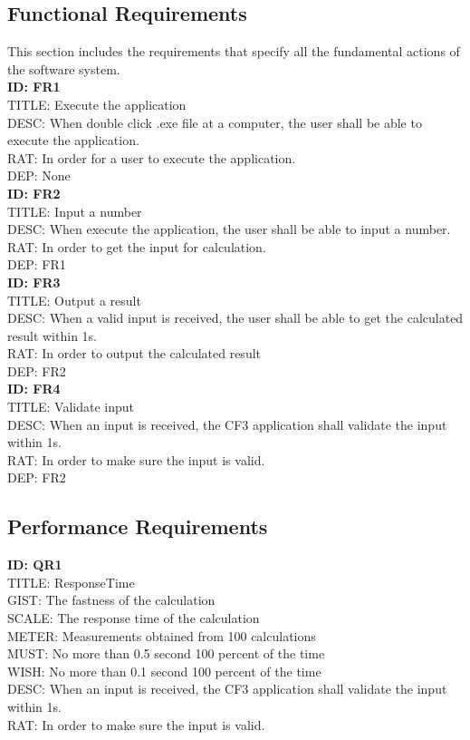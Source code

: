 \documentclass[12pt]{article}
\begin{document}
{\begin{normalsize}
\subsection{Functional Requirements}
This section includes the requirements that specify all the fundamental actions of the software system.\\
\textbf{ID: FR1} \\
TITLE: Execute the application \\
DESC: When double click .exe file at a computer, the user shall be able to execute the application.\\
RAT: In order for a user to execute the application.\\
DEP: None\\
\textbf{ID: FR2} \\
TITLE: Input a number\\
DESC: When execute the application, the user shall be able to input a number. \\
RAT: In order to get the input for calculation.\\
DEP: FR1\\
\textbf{ID: FR3} \\
TITLE: Output a result\\
DESC: When a valid input is received, the user shall be able to get the calculated result within 1s.\\
RAT: In order to output the calculated result\\
DEP: FR2\\
\textbf{ID: FR4} \\
TITLE: Validate input\\
DESC: When an input is received, the CF3 application shall validate the input within 1s. \\
RAT: In order to make sure the input is valid.\\
DEP: FR2\\
\subsection{Performance Requirements}
\textbf{ID: QR1} \\
TITLE: ResponseTime\\
GIST: The fastness of the calculation\\
SCALE: The response time of the calculation\\
METER: Measurements obtained from 100 calculations\\
MUST: No more than 0.5 second 100 percent of the time\\
WISH: No more than 0.1 second 100 percent of the time\\
DESC: When an input is received, the CF3 application shall validate the input within 1s. \\
RAT: In order to make sure the input is valid.\\


\end{normalsize}}
\end{document}
